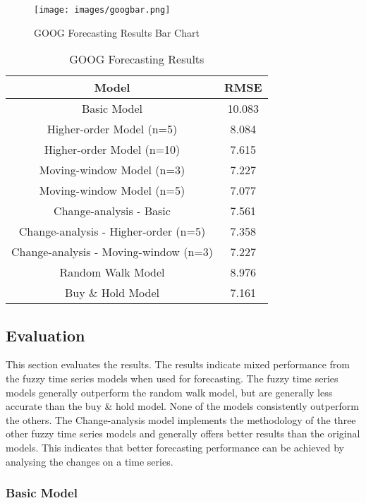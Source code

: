 \documentclass[12pt, oneside, a4paper]{article}
\theoremstyle{definition}
\begin{document}
\begin{figure}[H]
    \centering
    \caption{GOOG Forecasting Results Bar Chart}
    \texttt{[image: images/googbar.png]}
    \label{googbar}
\end{figure}

\begin{table}[H]
	\center
	\begin{tabulary}{1.0\textwidth}{CC}
	\toprule[.15em]
	Model & RMSE \\
	\toprule[.15em]
	Basic Model & 10.083 \\
	\hline
	Higher-order Model (n=5) & 8.084\\
	\hline
	Higher-order Model (n=10) & 7.615\\
	\hline
	Moving-window Model (n=3) & 7.227\\
	\hline
	Moving-window Model (n=5) & 7.077\\
	\hline
	Change-analysis - Basic & 7.561\\
	\hline
	Change-analysis - Higher-order (n=5) & 7.358\\
	\hline
	Change-analysis - Moving-window (n=3) & 7.227\\
	\hline
	Random Walk Model & 8.976\\
	\hline
	Buy \& Hold Model & 7.161\\
  	\toprule[.15em]
	\end{tabulary}
	\caption{GOOG Forecasting Results}
	\label{googresults}
\end{table}

\newpage

\subsection{Evaluation}

This section evaluates the results. The results indicate mixed performance from the fuzzy time series models when used for forecasting. The fuzzy time series models generally outperform the random walk model, but are generally less accurate than the buy \& hold model. None of the models consistently outperform the others. The Change-analysis model implements the methodology of the three other fuzzy time series models and generally offers better results than the original models. This indicates that better forecasting performance can be achieved by analysing the changes on a time series.

\subsubsection{Basic Model}
\end{document}
